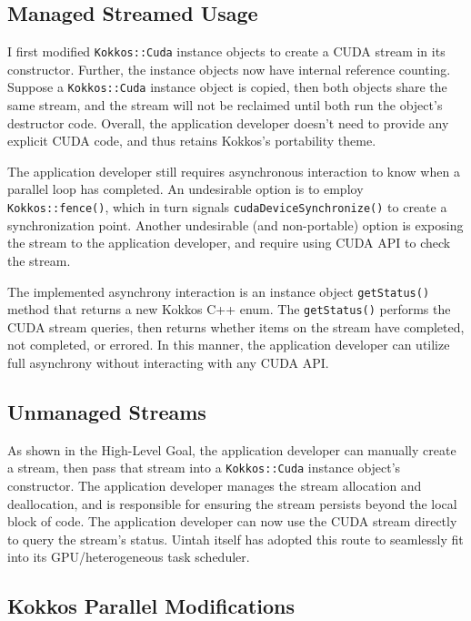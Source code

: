 \documentclass[]{article}
\begin{document}
\subsection{Managed Streamed Usage}  
\label{sec:managed_streams}

I first modified \texttt{Kokkos::Cuda} instance objects to create a CUDA stream in its constructor.  Further, the instance objects now have internal reference counting.  Suppose a \texttt{Kokkos::Cuda} instance object is copied, then both objects share the same stream, and the stream will not be reclaimed until both run the object's destructor code.  Overall, the application developer doesn't need to provide any explicit CUDA code, and thus retains Kokkos's portability theme.  

The application developer still requires asynchronous interaction to know when a parallel loop has completed.  An undesirable option is to employ \\ \texttt{Kokkos::fence()}, which in turn signals \texttt{cudaDeviceSynchronize()} to create a synchronization point.  Another undesirable (and non-portable) option is exposing the stream to the application developer, and require using CUDA API to check the stream.

The implemented asynchrony interaction is an instance object \texttt{getStatus()} method that returns a new Kokkos C++ enum.  The \texttt{getStatus()} performs the CUDA stream queries, then returns whether items on the stream have completed, not completed, or errored.  In this manner, the application developer can utilize full asynchrony without interacting with any CUDA API.

\subsection{Unmanaged Streams}  
\label{sec:unmanaged_streams}

As shown in the High-Level Goal, the application developer can manually create a stream, then pass that stream into a \texttt{Kokkos::Cuda} instance object's constructor.  The application developer manages the stream allocation and deallocation, and is responsible for ensuring the stream persists beyond the local block of code.  The application developer can now use the CUDA stream directly to query the stream's status.  Uintah itself has adopted this route to seamlessly fit into its GPU/heterogeneous task scheduler.

\subsection{Kokkos Parallel Modifications}
\end{document}
